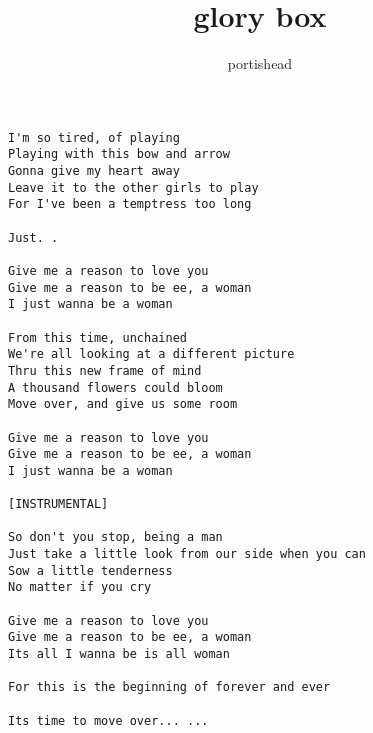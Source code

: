 \author{portishead}
\title{glory box}
\maketitle
\begin{verbatim}
I'm so tired, of playing
Playing with this bow and arrow
Gonna give my heart away
Leave it to the other girls to play
For I've been a temptress too long

Just. .

Give me a reason to love you
Give me a reason to be ee, a woman
I just wanna be a woman

From this time, unchained
We're all looking at a different picture
Thru this new frame of mind
A thousand flowers could bloom
Move over, and give us some room

Give me a reason to love you
Give me a reason to be ee, a woman
I just wanna be a woman

[INSTRUMENTAL]

So don't you stop, being a man
Just take a little look from our side when you can
Sow a little tenderness
No matter if you cry

Give me a reason to love you
Give me a reason to be ee, a woman
Its all I wanna be is all woman

For this is the beginning of forever and ever

Its time to move over... ...
\end{verbatim}